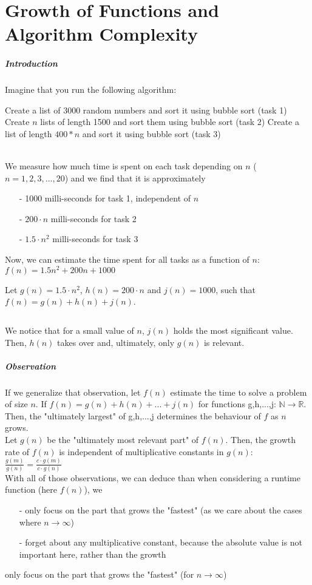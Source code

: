 \documentclass[10pt,a4paper]{book}
\newcommand{\R}{\mathbb{R}}
\newcommand{\N}{\mathbb{N}}
\newcommand{\ind}{\hspace*{\parindent}}
\begin{document}
\chapter{Growth of Functions and Algorithm Complexity}
\paragraph*{Introduction}
Imagine that you run the following algorithm:
\begin{algorithm}
\DontPrintSemicolon
Create a list of 3000 random numbers and sort it using bubble sort (task 1)\;
Create $n$ lists of length 1500 and sort them using bubble sort (task 2)\;
Create a list of length $400*n$ and sort it using bubble sort (task 3)
\caption{$Sort\_tasks(n: integer)$}
\end{algorithm}\\
\ind We measure how much time is spent on each task depending on $n$ ($n = 1,2,3,...,20$) and we find that it is approximately
\begin{itemize}
\item[-]1000 milli-seconds for task 1, independent of $n$
\item[-]$200\cdot n$ milli-seconds for task 2
\item[-]$1.5\cdot n^2$ milli-seconds for task 3
\end{itemize}
\ind Now, we can estimate the time spent for all tasks as a function of $n$: $f(n)=1.5n^{2}+200n+1000$\par
Let $g(n)=1.5\cdot n^2$, $h(n)=200\cdot n$ and $j(n)=1000$, such that $f(n)=g(n)+h(n)+j(n)$.\par
$\ $\par
We notice that for a small value of $n$, $j(n)$ holds the most significant value. Then, $h(n)$ takes over and, ultimately, only $g(n)$ is relevant.
\paragraph*{Observation}
\ind If we generalize that observation, let $f(n)$ estimate the time to solve a problem of size $n$. If $f(n)=g(n)+h(n)+...+j(n)$ for functions g,h,...,j: $\N \to \R$. Then, the "ultimately largest" of g,h,...,j determines the behaviour of $f$ as $n$ grows.\\
\ind Let $g(n)$ be the "ultimately most relevant part" of $f(n)$. Then, the growth rate of $f(n)$ is independent of multiplicative constants in $g(n)$:
$\frac{g(m)}{g(n)}=\frac{c\cdot g(m)}{c\cdot g(n)}$\\
\ind With all of those observations, we can deduce than when considering a runtime function (here $f(n)$), we 
\begin{itemize}
\item[-]only focus on the part that grows the "fastest" (as we care about the cases where $n \to \infty$)
\item[-]forget about any multiplicative constant, because the absolute value is not important here, rather than the growth
\end{itemize}
only focus on the part that grows the "fastest" (for $n \to \infty$)
\end{document}
